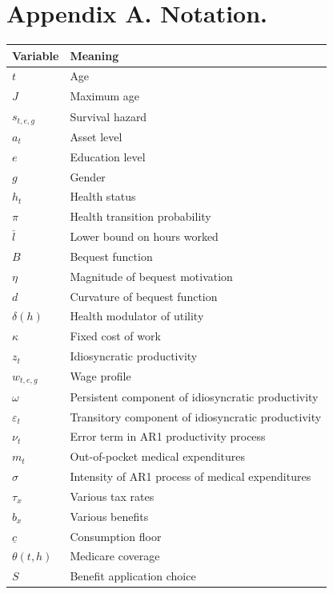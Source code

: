 \documentclass[
10pt, %
a4paper, %
oneside, %
headinclude,footinclude, %
BCOR5mm, %
]{scrartcl}
\begin{document}

\section{Appendix A. Notation.}

\begin{center}
	\begin{tabular}{| l | l |}
	\hline
	Variable & Meaning \\
	\hline
	$t$ & Age \\
	$J$ & Maximum age \\
	$s_{t,e,g}$ & Survival hazard \\
	$a_{t}$ & Asset level \\
	$e$ & Education level \\
	$g$ & Gender \\
	$h_{t}$ & Health status \\
	$\pi$ & Health transition probability \\
	$\bar{l}$ & Lower bound on hours worked \\
	$B$ & Bequest function \\
	$\eta$ & Magnitude of bequest motivation \\
	$d$ & Curvature of bequest function \\
	$\delta(h)$ & Health modulator of utility \\
	$\kappa$ &  Fixed cost of work \\
	$z_{t}$ & Idiosyncratic productivity \\
	$w_{t,e,g}$ & Wage profile \\
	$\omega$ & Persistent component of idiosyncratic productivity \\
	$\varepsilon_t$ & Transitory component of idiosyncratic productivity \\
	$\nu_t$ & Error term in AR1 productivity process \\
	$m_t$ & Out-of-pocket medical expenditures \\
	$\sigma$ & Intensity of AR1 process of medical expenditures \\
	$\tau_x$ & Various tax rates \\
	$b_x$ & Various benefits \\
	$\underline{c}$ & Consumption floor \\
	$\theta(t,h)$ & Medicare coverage \\
	$S$ &  Benefit application choice \\
	\hline
	\end{tabular}
\end{center}




\renewcommand{\refname}{\spacedlowsmallcaps{References}} %




\end{document}
